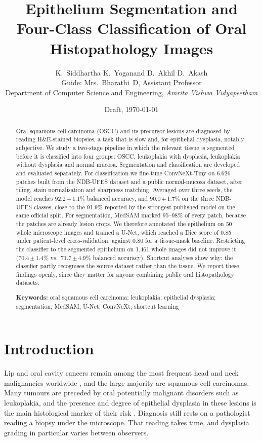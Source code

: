 \documentclass[10pt,twocolumn]{article}
\title{\vspace{-1.2em}\textbf{Epithelium Segmentation and Four-Class Classification of Oral Histopathology Images}}
\author{%
  K.~Siddhartha \quad K.~Yoganand \quad D.~Akhil \quad D.~Akash\\[2pt]
  \small Guide: Mrs.~Bharathi~D, Assistant Professor\\
  \small Department of Computer Science and Engineering, \textit{Amrita Vishwa Vidyapeetham}}
\date{\small Draft, \today}
\begin{document}
\maketitle

\begin{abstract}
\noindent Oral squamous cell carcinoma (OSCC) and its precursor lesions are diagnosed by reading H\&E-stained biopsies, a task that is slow and, for epithelial dysplasia, notably subjective. We study a two-stage pipeline in which the relevant tissue is segmented before it is classified into four groups: OSCC, leukoplakia with dysplasia, leukoplakia without dysplasia and normal mucosa. Segmentation and classification are developed and evaluated separately. For classification we fine-tune ConvNeXt-Tiny on 6,626 patches built from the NDB-UFES dataset and a public normal-mucosa dataset, after tiling, stain normalisation and sharpness matching. Averaged over three seeds, the model reaches 92.2\,$\pm$\,1.1\% balanced accuracy, and 90.0\,$\pm$\,1.7\% on the three NDB-UFES classes, close to the 91.9\% reported by the strongest published model on the same official split. For segmentation, MedSAM marked 95--98\% of every patch, because the patches are already lesion crops. We therefore annotated the epithelium on 50 whole microscope images and trained a U-Net, which reached a Dice score of 0.85 under patient-level cross-validation, against 0.80 for a tissue-mask baseline. Restricting the classifier to the segmented epithelium on 1,461 whole images did not improve it (70.4\,$\pm$\,1.4\% vs.\ 71.7\,$\pm$\,4.9\% balanced accuracy). Shortcut analyses show why: the classifier partly recognises the source dataset rather than the tissue. We report these findings openly, since they matter for anyone combining public oral histopathology datasets.

\medskip
\noindent\textbf{Keywords:} oral squamous cell carcinoma; leukoplakia; epithelial dysplasia; segmentation; MedSAM; U-Net; ConvNeXt; shortcut learning
\end{abstract}

\section{Introduction}

Lip and oral cavity cancers remain among the most frequent head and neck malignancies worldwide \citep{bray2024}, and the large majority are squamous cell carcinomas. Many tumours are preceded by oral potentially malignant disorders such as leukoplakia, and the presence and degree of epithelial dysplasia in these lesions is the main histological marker of their risk \citep{muller2022}. Diagnosis still rests on a pathologist reading a biopsy under the microscope. That reading takes time, and dysplasia grading in particular varies between observers.
\end{document}
